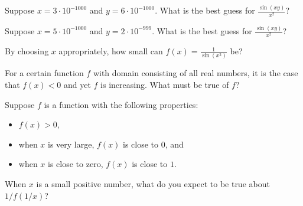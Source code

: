 \documentclass{ximera}
\newcommand{\recommendation}[1]{}
\begin{document}
\begin{problem}
  Suppose $x = 3 \cdot 10^{-1000}$ and $y = 6 \cdot 10^{-1000}$.  What is the best guess for $\frac{\sin (xy)}{x^2}$?
  \begin{multipleChoice}
  \end{multipleChoice}
\end{problem}

\begin{problem}
  Suppose $x = 5 \cdot 10^{-1000}$ and $y = 2 \cdot 10^{-999}$.  What is the best guess for $\frac{\sin (xy)}{x^2}$?
  \begin{multipleChoice}
  \end{multipleChoice}
\end{problem}

\begin{problem}
  By choosing $x$ appropriately, how small can $f(x) = \frac{1}{\sin (x^2)}$ be?
  \begin{multipleChoice}
  \end{multipleChoice}
\end{problem}



\begin{problem}
  For a certain function $f$ with domain consisting of all real
  numbers, it is the case that $f(x) < 0$ and yet $f$ is increasing.
  What must be true of $f$?
  \begin{multipleChoice}
  \end{multipleChoice}
\end{problem}

\begin{problem}
  Suppose $f$ is a function with the following properties:
  \begin{itemize}
  \item $f(x) > 0$,
  \item when $x$ is very large, $f(x)$ is close to $0$, and
  \item when $x$ is close to zero, $f(x)$ is close to $1$.
  \end{itemize}
  When $x$ is a small positive number, what do you expect to be true about $1/f(1/x)$?
  \begin{multipleChoice}
  \end{multipleChoice}
\end{problem}
\end{document}

